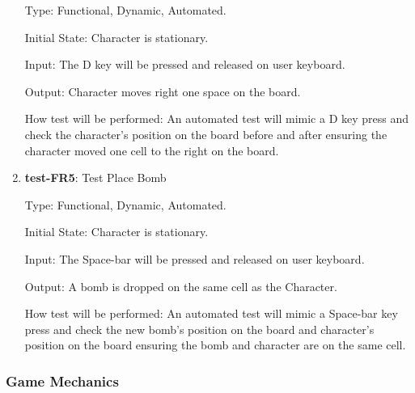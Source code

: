 \documentclass[12pt, titlepage]{article}
\begin{document}
\begin{enumerate}
Type: Functional, Dynamic, Automated.
					
Initial State: Character is stationary.
					
Input: The D key will be pressed and released on user keyboard.
					
Output: Character moves right one space on the board.
					
How test will be performed: An automated test will mimic a D key press and check the character's position on the board before and after ensuring the character moved one cell to the right on the board.

\item{\textbf{test-FR5}: Test Place Bomb\\}

Type: Functional, Dynamic, Automated.
					
Initial State: Character is stationary.
					
Input: The Space-bar will be pressed and released on user keyboard.
					
Output: A bomb is dropped on the same cell as the Character.
					
How test will be performed: An automated test will mimic a Space-bar key press and check the new bomb's position on the board and character's position on the board ensuring the bomb and character are on the same cell.

\end{enumerate}

\subsubsection{Game Mechanics}
\end{document}
